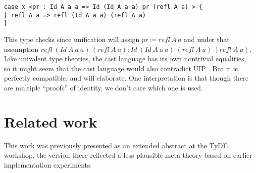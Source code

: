 \begin{lstlisting}[basicstyle={\ttfamily\small}]
case x <pr : Id A a a => Id (Id A a a) pr (refl A a) > {
| refl A a => refl (Id A a a) (refl A a)
}
\end{lstlisting}

This type checks since unification will assign $pr\coloneqq refl\,A\,a$
and under that assumption $refl\ (Id\ A\ a\ a)\ (refl\ A\ a):Id\ (Id\ A\ a\ a)\ (refl\ A\ a)\ (refl\ A\ a)$.
Like univalent type theories, the cast language has its own nontrivial
equalities, so it might seem that the cast language would also contradict
UIP . But it is perfectly compatible, and will elaborate. One interpretation
is that though there are multiple ``proofs'' of identity, we don't
care which one is used. 


\section{Related work}

This work was previously presented as an extended abstract at the
TyDE workshop, the version there reflected a less
plausible meta-theory based on earlier implementation experiments.



